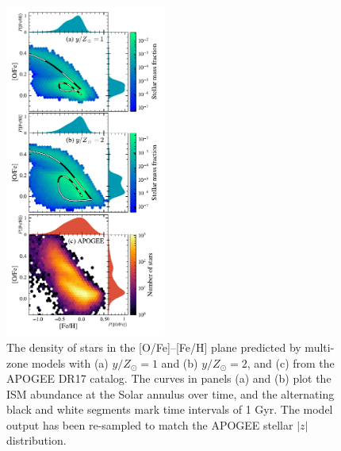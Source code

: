 \documentclass[twocolumn,twocolappendix,linenumbers]{aastex631}
\newcommand{\onecolumn}{0.47\textwidth}
\begin{document}
\begin{figure}
    \centering
    \includegraphics[width=\onecolumn]{figures/ofe_feh_density.pdf}
    \caption{The density of stars in the [O/Fe]--[Fe/H] plane predicted by multi-zone models with (a) $y/Z_\odot=1$ and (b) $y/Z_\odot=2$, and (c) from the APOGEE DR17 catalog. The curves in panels (a) and (b) plot the ISM abundance at the Solar annulus over time, and the alternating black and white segments mark time intervals of {1 Gyr}. The model output has been re-sampled to match the APOGEE stellar $|z|$ distribution.
}
\end{figure}
\end{document}

